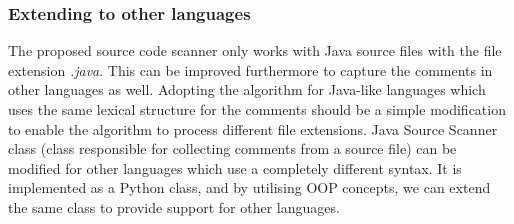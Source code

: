 \documentclass[conference]{IEEEtran}
\begin{document}
\subsubsection{Extending to other languages} 

The proposed source code scanner only works with Java source files with the file extension \textit{.java}. This can be improved furthermore to capture the comments in other languages as well. Adopting the algorithm for Java-like languages which uses the same lexical structure for the comments should be a simple modification to enable the algorithm to process different file extensions. Java Source Scanner class (class responsible for collecting comments from a source file) can be modified for other languages which use a completely different syntax. It is implemented as a Python class, and by utilising OOP concepts, we can extend the same class to provide support for other languages. 



\end{document}
